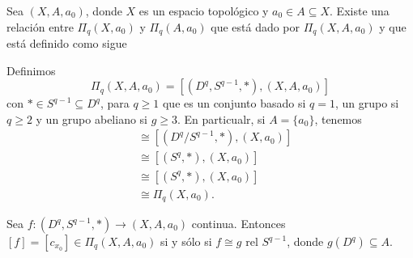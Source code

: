Sea $(X,A,a_0)$, donde $X$ es un espacio topológico y $a_0\in A\subseteq X$. Existe una relación entre $\Pi_q(X,a_0)$ y $\Pi_q(A,a_0)$ que está dado por $\Pi_q(X,A,a_0)$ y que está definido como sigue
\begin{definicion}
    Definimos 
    \begin{equation*}
        \Pi_q(X,A,a_0)=[(D^q,S^{q-1},*),(X,A,a_0)]
    \end{equation*}
    con $*\in S^{q-1}\subseteq D^q$, para $q\geq 1$ que es un conjunto basado si $q=1$, un grupo si $q\geq 2$ y un grupo abeliano si $g\geq 3$. En particualr, si $A=\{a_0\}$, tenemos
    \begin{align*}
        [(D^q,S^{q-1},*),(X,\{a_0\},a_0)]&\cong [(D^q/S^{q-1},*),(X,a_0)]\\
        &\cong[(S^q,*),(X,a_0)]\\
        &\cong [(S^q,*),(X,a_0)]\\
        &\cong \Pi_q(X,a_0).
    \end{align*}
\end{definicion}
\begin{prop}
    Sea $f:(D^q,S^{q-1},*)\to(X,A,a_0)$ continua. Entonces $[f]=[c_{x_0}]\in\Pi_q(X,A,a_0)$ si y sólo si $f\cong g \text{ rel } S^{q-1}$, donde $g(D^q)\subseteq A$.
\end{prop}
